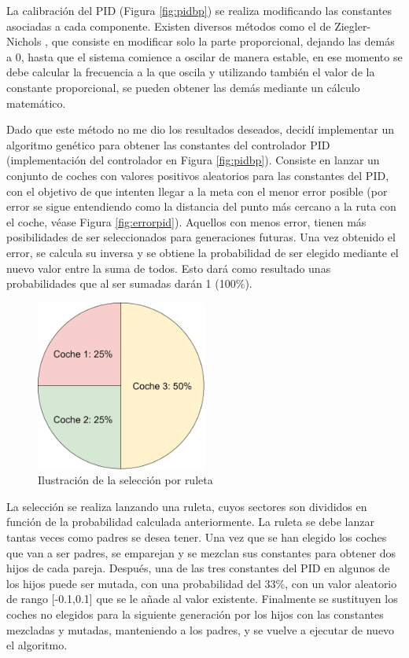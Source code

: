 La calibración del PID (Figura \ref{fig:pidbp}) se realiza modificando las constantes asociadas a cada componente. Existen diversos métodos como el de Ziegler-Nichols \cite{10.1115/1.4019264}, que consiste en modificar solo la parte proporcional, dejando las demás a 0, hasta que el sistema comience a oscilar de manera estable, en ese momento se debe calcular la frecuencia a la que oscila y utilizando también el valor de la constante proporcional, se pueden obtener las demás mediante un cálculo matemático.

\bigskip

Dado que este método no me dio los resultados deseados, decidí implementar un algoritmo genético para obtener las constantes del controlador PID (implementación del controlador en Figura \ref{fig:pidbp}). Consiste en lanzar un conjunto de coches con valores positivos aleatorios para las constantes del PID, con el objetivo de que intenten llegar a la meta con el menor error posible (por error se sigue entendiendo como la distancia del punto más cercano a la ruta con el coche, véase Figura \ref{fig:errorpid}). Aquellos con menos error, tienen más posibilidades de ser seleccionados para generaciones futuras. Una vez obtenido el error, se calcula su inversa y se obtiene la probabilidad de ser elegido mediante el nuevo valor entre la suma de todos. Esto dará como resultado unas probabilidades que al ser sumadas darán 1 (100\%). 

\bigskip
\begin{figure}[H]
    \centering
    \includegraphics[width=0.5\textwidth]{imagenes/ruleta.png}
    \caption{Ilustración de la selección por ruleta}
    \label{fig:ruleta}
\end{figure}

La selección se realiza lanzando una ruleta\cite{gaperformance}, cuyos sectores son divididos en función de la probabilidad calculada anteriormente. La ruleta se debe lanzar tantas veces como padres se desea tener. Una vez que se han elegido los coches que van a ser padres, se emparejan y se mezclan sus constantes para obtener dos hijos de cada pareja. Después, una de las tres constantes del PID en algunos de los hijos puede ser mutada, con una probabilidad del 33\%, con un valor aleatorio de rango [-0.1,0.1] que se le añade al valor existente. Finalmente se sustituyen los coches no elegidos para la siguiente generación por los hijos con las constantes mezcladas y mutadas, manteniendo a los padres, y se vuelve a ejecutar de nuevo el algoritmo.

